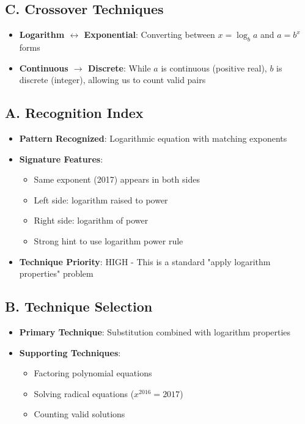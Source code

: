 \documentclass[]{article}
\begin{document}
\begin{tacticalbox}
\subsection*{C. Crossover Techniques}
\begin{itemize}[leftmargin=*]
    \item \textbf{Logarithm $\leftrightarrow$ Exponential}: Converting between $x = \log_b a$ and $a = b^x$ forms
    
    \item \textbf{Continuous $\rightarrow$ Discrete}: While $a$ is continuous (positive real), $b$ is discrete (integer), allowing us to count valid pairs
\end{itemize}
\end{tacticalbox}

\begin{techniquesbox}
\subsection*{A. Recognition Index}
\begin{itemize}[leftmargin=*]
    \item \textbf{Pattern Recognized}: Logarithmic equation with matching exponents
    
    \item \textbf{Signature Features}:
    \begin{itemize}
        \item Same exponent (2017) appears in both sides
        \item Left side: logarithm raised to power
        \item Right side: logarithm of power
        \item Strong hint to use logarithm power rule
    \end{itemize}
    
    \item \textbf{Technique Priority}: HIGH - This is a standard "apply logarithm properties" problem
\end{itemize}

\subsection*{B. Technique Selection}
\begin{itemize}[leftmargin=*]
    \item \textbf{Primary Technique}: Substitution combined with logarithm properties
    
    \item \textbf{Supporting Techniques}:
    \begin{itemize}
        \item Factoring polynomial equations
        \item Solving radical equations ($x^{2016} = 2017$)
        \item Counting valid solutions
    \end{itemize}
    

\end{itemize}
\end{techniquesbox}
\end{document}
